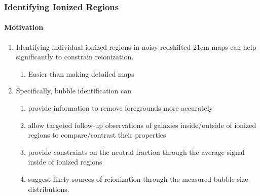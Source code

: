\documentclass{beamer}
\begin{document}
%

\begin{frame}
\frametitle{Identifying Ionized Regions}
\framesubtitle{Motivation}
\begin{enumerate}[-]
\item Identifying individual ionized regions in noisy redshifted 21cm maps can help significantly to constrain reionization.
\begin{enumerate}[$\to$]
\item Easier than making detailed maps
\end{enumerate}
\item Specifically, bubble identification can
\begin{enumerate}[$\to$]
\item provide information to remove foregrounds more accurately
\item allow targeted follow-up observations of galaxies inside/outside of ionized regions to compare/contrast their properties
\item provide constraints on the neutral fraction through the average signal inside of ionized regions
\item suggest likely sources of reionization through the measured bubble size distributions.
\end{enumerate}
\end{enumerate}
\end{frame}
\end{document}
